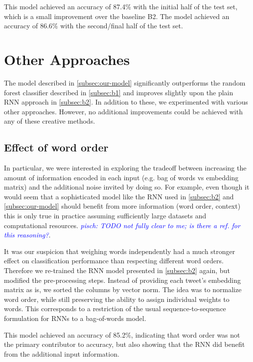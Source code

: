 \documentclass[10pt,conference,compsocconf]{IEEEtran}
\newcommand{\pisch}[1]{\textit{\textcolor{blue}{pisch: #1}}}
\begin{document}
This model achieved an accuracy of 87.4\% with the initial half of the test set,
which is a small improvement over the baseline B2.
The model achieved an accuracy of 86.6\% with the second/final half of the test set.

\section{Other Approaches} \label{sec:other}

The model described in \autoref{subsec:our-model} significantly outperforms
the random forest classifier described in \autoref{subsec:b1} and improves
slightly upon the plain RNN approach in \autoref{subsec:b2}. In addition to
these, we experimented with various other approaches.
However, no additional improvements could be achieved with
any of these creative methods.

\subsection*{Effect of word order}

In particular, we were interested in exploring the tradeoff between
increasing the amount of information encoded in each input (e.g. bag
of words vs embedding matrix) and the additional noise invited by
doing so. For example, even though it would seem that a sophisticated
model like the RNN used in \autoref{subsec:b2} and \autoref{subsec:our-model}
should benefit from more information (word order, context) this is only true
in practice assuming sufficiently large datasets and computational
resources. \pisch{TODO not fully clear to me; is there a ref. for this reasoning?}.

It was our suspicion that weighing words independently had a much
stronger effect on classification performance than respecting
different word orders. Therefore we re-trained the RNN model presented
in \autoref{subsec:b2} again, but modified the pre-processing
steps. Instead of providing each tweet's embedding matrix as is, we
sorted the columns by vector norm. The idea was to normalize word
order, while still preserving the ability to assign individual weights
to words. This corresponds to a restriction of the usual
sequence-to-sequence formulation for RNNs to a bag-of-words model.

This model achieved an accuracy of 85.2\%, indicating that word order
was not the primary contributor to accuracy, but also showing that the
RNN did benefit from the additional input information.
\end{document}

